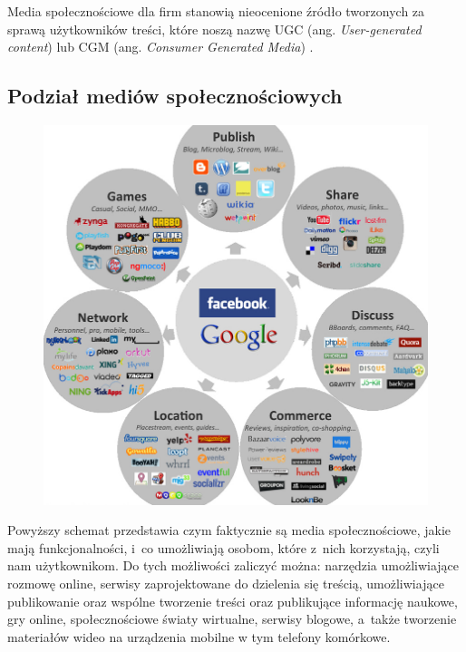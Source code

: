 Media społecznościowe dla firm stanowią nieocenione źródło tworzonych za sprawą użytkowników treści, które noszą nazwę UGC (ang. \textit{User-generated content}) lub CGM (ang. \textit{Consumer Generated Media}) \cite{url:wiki-mashup}.


\subsection{Podział mediów społecznościowych}

\begin{figure}[!h]
\centering
    \scalebox{0.9}
    {
        \includegraphics{images/lukasz/social-media-landscape-20111_k.jpg}
    }
    \label{fig:sample-google-plus-company-profile-page}
\end{figure}

Powyższy schemat przedstawia czym faktycznie są media społecznościowe, jakie mają funkcjonalności, i~co umożliwiają osobom, które z~nich korzystają, czyli nam użytkownikom. Do tych możliwości zaliczyć można: narzędzia umożliwiające rozmowę online, serwisy zaprojektowane do dzielenia się treścią, umożliwiające publikowanie oraz wspólne tworzenie treści oraz publikujące informację naukowe, gry online, społecznościowe światy wirtualne, serwisy blogowe, a~także tworzenie materiałów wideo na urządzenia mobilne w tym telefony komórkowe.

